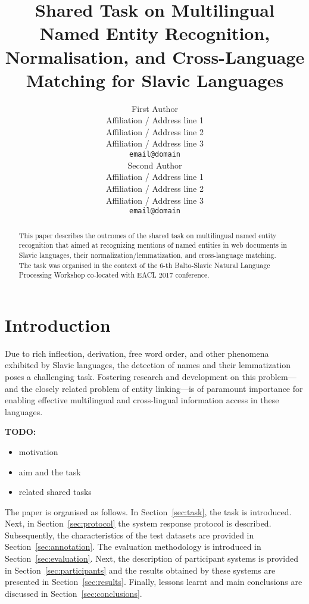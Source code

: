 \documentclass[11pt]{article}
\title{Shared Task on Multilingual Named Entity Recognition, Normalisation, and Cross-Language Matching for Slavic Languages}
\author{First Author \\
  Affiliation / Address line 1 \\
  Affiliation / Address line 2 \\
  Affiliation / Address line 3 \\
  {\tt email@domain} \\\And
  Second Author \\
  Affiliation / Address line 1 \\
  Affiliation / Address line 2 \\
  Affiliation / Address line 3 \\
  {\tt email@domain} \\}
\date{}
\newcommand{\dontsubmit}[1]{{\color{blue} #1}} %
\newcommand{\URGENT}[1]{\dontsubmit{\bf \color{red} #1}} %
\begin{document}
\maketitle
\begin{abstract}
This paper describes the outcomes of the shared task on multilingual named entity recognition 
that aimed at recognizing mentions of named entities in web documents in Slavic languages, 
their normalization/lemmatization, and cross-language matching. The task was organised in 
the context of the 6-th Balto-Slavic Natural Language Processing Workshop co-located with 
EACL 2017 conference. 
\end{abstract}

\section{Introduction}
\label{sec:intro}

Due to rich inflection, derivation, free word order, and other phenomena
exhibited by Slavic languages, the detection of names and their
lemmatization poses a challenging task.  Fostering research and
development on this problem---and the closely related problem of entity
linking---is of paramount importance for enabling effective multilingual
and cross-lingual information access in these languages.

\URGENT{TODO:}

\begin{itemize}

\item motivation

\item aim and the task

\item related shared tasks

\end{itemize}

The paper is organised as follows. In Section~\ref{sec:task}, the task is
introduced.  Next, in Section~\ref{sec:protocol} the system response
protocol is described.  Subsequently, the characteristics of the test
datasets are provided in Section~\ref{sec:annotation}.  The evaluation
methodology is introduced in Section~\ref{sec:evaluation}.  Next, the
description of participant systems is provided in
Section~\ref{sec:participants} and the results obtained by these systems
are presented in Section~\ref{sec:results}.  Finally, lessons learnt and
main conclusions are discussed in Section~\ref{sec:conclusions}.
\end{document}
